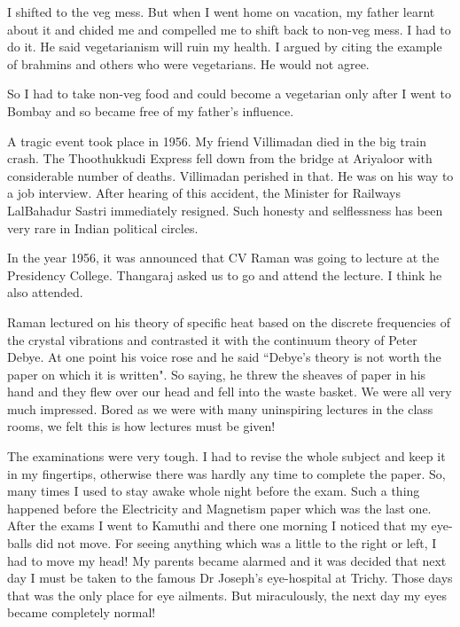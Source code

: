 I shifted to the veg mess. But when I went home on vacation, my father 
learnt about it and chided me and compelled me to shift back to non-veg 
mess. I had to do it. He said vegetarianism will ruin my health. I 
argued by citing the example of brahmins and others who were 
vegetarians. He would not agree.
\smallskip

So I had to take non-veg food and could become a vegetarian only after I 
went to Bombay and so became free of my father's influence.
\smallskip
 
A tragic event took place in 1956. My friend Villimadan died in the big 
train crash. The Thoothukkudi Express fell down from the bridge at 
Ariyaloor with considerable number of deaths. Villi\-madan perished in 
that. He was on his way to a job interview. After hearing of this 
accident, the Minister for Railways Lal\break Bahadur Sastri immediately 
resigned. Such honesty and selflessness has been very rare in Indian 
political circles.
\smallskip

In the year 1956, it was announced that CV Raman was going to lecture at 
the Presidency College. Thangaraj asked us to go and attend the lecture. 
I think he also attended.
\smallskip

Raman lectured on his theory of specific heat based on the discrete 
frequencies of the crystal vibrations and contrasted it with the 
continuum theory of Peter Debye. At one point his voice rose and he said 
``Debye's theory is not worth the paper on which it is written". So 
saying, he threw the sheaves of paper in his hand and they flew over our 
head and fell into the waste basket. We were all very much impressed. 
Bored as we were with many uninspiring lectures in the class rooms, we 
felt this is how lectures must be given!
\smallskip

The examinations were very tough. I had to revise the whole subject and 
keep it in my fingertips, otherwise there was hardly any time to 
complete the paper. So, many times I used to stay awake whole night 
before the exam. Such a thing happened before the Electricity and 
Magnetism paper which was the last one. After the exams I went to 
Kamuthi and there one morning I noticed that my eye-balls did not move. 
For seeing anything which was a little to the right or left, I had to 
move my head! My parents became alarmed and it was decided that next day 
I must be taken to the famous Dr Joseph's eye-hospital at Trichy. Those 
days that was the only place for eye ailments. But miraculously, the 
next day my eyes became completely normal!


